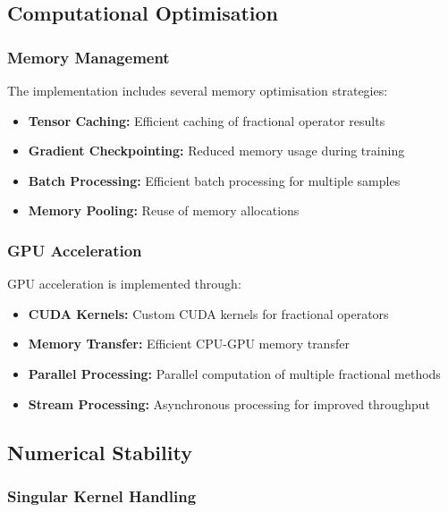 \documentclass[12pt,a4paper]{article}
\theoremstyle{definition}
\begin{document}
\subsection{Computational Optimisation}

\subsubsection{Memory Management}

The implementation includes several memory optimisation strategies:

\begin{itemize}
    \item \textbf{Tensor Caching:} Efficient caching of fractional operator results
    \item \textbf{Gradient Checkpointing:} Reduced memory usage during training
    \item \textbf{Batch Processing:} Efficient batch processing for multiple samples
    \item \textbf{Memory Pooling:} Reuse of memory allocations
\end{itemize}

\subsubsection{GPU Acceleration}

GPU acceleration is implemented through:

\begin{itemize}
    \item \textbf{CUDA Kernels:} Custom CUDA kernels for fractional operators
    \item \textbf{Memory Transfer:} Efficient CPU-GPU memory transfer
    \item \textbf{Parallel Processing:} Parallel computation of multiple fractional methods
    \item \textbf{Stream Processing:} Asynchronous processing for improved throughput
\end{itemize}

\subsection{Numerical Stability}

\subsubsection{Singular Kernel Handling}
\end{document}
